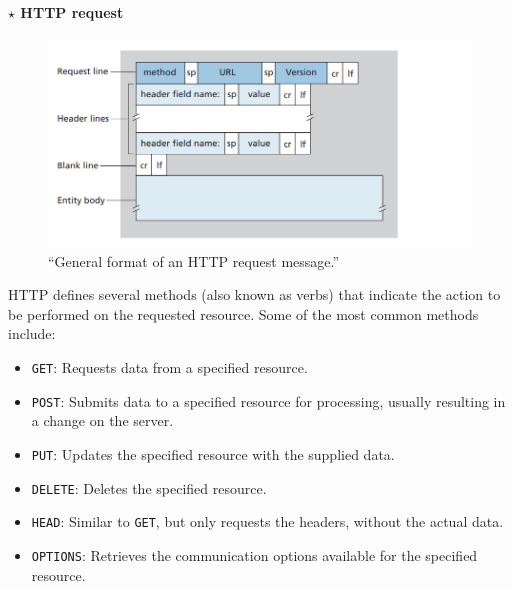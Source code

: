 \paragraph[2.2.5.1 HTTP request]{$\pmb{\star}$ HTTP request}\mbox{}

\begin{figure}[H]
    \centering
    \includegraphics[width = 0.9\linewidth]{img/2/http-request-format.png}
    \caption{``General format of an HTTP request message.''\cite{Kurose2017}}
    \label{fig:http-request-format}
\end{figure}

\noindent HTTP defines several methods (also known as verbs) that indicate the action to be performed on the requested resource. Some of the most common methods include:
\begin{itemize}
    \item \texttt{GET}: Requests data from a specified resource.
    \item \texttt{POST}: Submits data to a specified resource for processing, usually resulting in a change on the server.
    \item \texttt{PUT}: Updates the specified resource with the supplied data.
    \item \texttt{DELETE}: Deletes the specified resource.
    \item \texttt{HEAD}: Similar to \texttt{GET}, but only requests the headers, without the actual data.
    \item \texttt{OPTIONS}: Retrieves the communication options available for the specified resource.
\end{itemize}

\renewcommand*{\thefootnote}{\fnsymbol{footnote}}
\renewcommand*{\thefootnote}{\arabic{footnote}}

